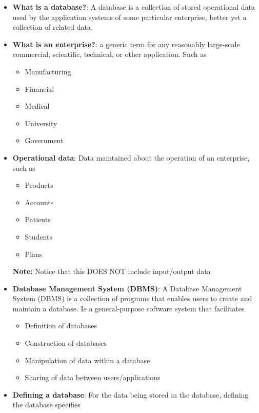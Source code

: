 \documentclass{report}
\begin{document}
    \begin{itemize}
        \item \textbf{What is a database?}: A database is a collection of stored operational data used by the application systems of some particular enterprise, better yet a collection of related data.
        \item \textbf{What is an enterprise?}: a generic term for any reasonably large-scale commercial, scientific, technical, or other application. Such as
            \begin{itemize}
                \item Manufacturing
                \item Financial
                \item Medical
                \item University
                \item Government
            \end{itemize}
        \item \textbf{Operational data}: Data maintained about the operation of an enterprise, such as
            \begin{itemize}
                \item Products
                \item Accounts
                \item Patients
                \item Students
                \item Plans
            \end{itemize}
            \bigbreak \noindent 
            \textbf{Note:} Notice that this DOES NOT include input/output data
        \item \textbf{Database Management System (DBMS)}: A Database Management System (DBMS) is a collection of programs that enables users to create and maintain a database. Ie a general-purpose software system that facilitates
            \begin{itemize}
                \item Definition of databases
                \item Construction of databases
                \item Manipulation of data within a database
                \item Sharing of data between users/applications
            \end{itemize}
        \item \textbf{Defining a database}: For the data being stored in the database, defining the database specifies

\end{itemize}
\end{document}
